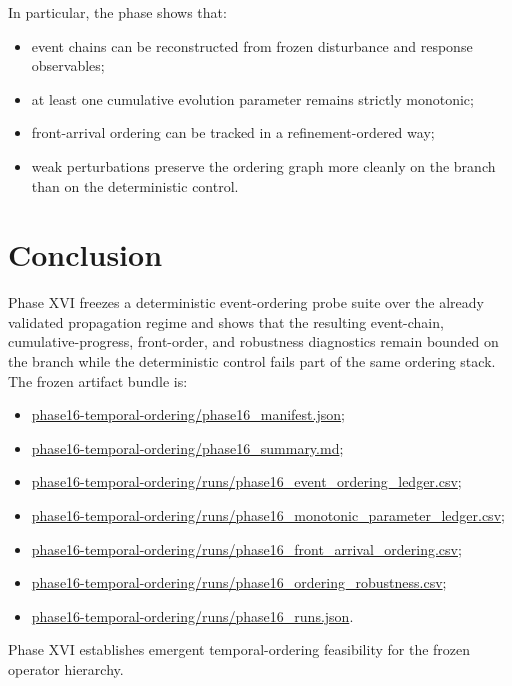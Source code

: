 \documentclass[11pt]{article}
\begin{document}
In particular, the phase shows that:
\begin{itemize}
\item event chains can be reconstructed from frozen disturbance and response observables;
\item at least one cumulative evolution parameter remains strictly monotonic;
\item front-arrival ordering can be tracked in a refinement-ordered way;
\item weak perturbations preserve the ordering graph more cleanly on the branch than on the deterministic control.
\end{itemize}

\section{Conclusion}

Phase XVI freezes a deterministic event-ordering probe suite over the already validated propagation regime and shows that the resulting event-chain, cumulative-progress, front-order, and robustness diagnostics remain bounded on the branch while the deterministic control fails part of the same ordering stack. The frozen artifact bundle is:
\begin{itemize}
\item \url{phase16-temporal-ordering/phase16_manifest.json};
\item \url{phase16-temporal-ordering/phase16_summary.md};
\item \url{phase16-temporal-ordering/runs/phase16_event_ordering_ledger.csv};
\item \url{phase16-temporal-ordering/runs/phase16_monotonic_parameter_ledger.csv};
\item \url{phase16-temporal-ordering/runs/phase16_front_arrival_ordering.csv};
\item \url{phase16-temporal-ordering/runs/phase16_ordering_robustness.csv};
\item \url{phase16-temporal-ordering/runs/phase16_runs.json}.
\end{itemize}

Phase XVI establishes emergent temporal-ordering feasibility for the frozen operator hierarchy.
\end{document}
